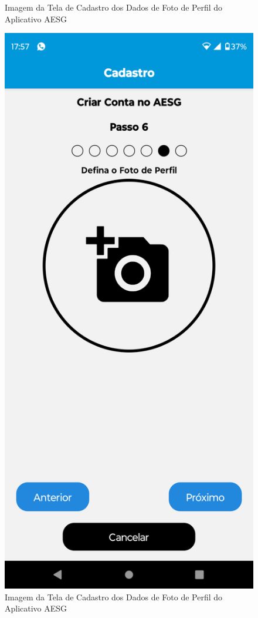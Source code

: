 \documentclass[
    12pt,                   %
    openright,              %
    oneside,                %
    a4paper,                %
    sumario=tradicional,    %
    english,                %
    brazil,                 %
    ]{abntex2}
\begin{document}
\begin{figure}[!h]
\begin{minipage}{0.5\textwidth}
                    \caption[Imagem da Tela de Cadastro dos Dados de Foto de Perfil do Aplicativo AESG]{ 
                    Imagem da Tela de Cadastro dos Dados de Foto de Perfil  do Aplicativo AESG}
                    \label{fig:AppTelaCadastro15}
                \end{minipage}%
                \begin{minipage}{0.5\textwidth}
                    \centering
                    \includegraphics[width=0.8\linewidth]{Imagens/App Images User/AUCadastro6.png}
                    \caption[Imagem da Tela de Cadastro dos Dados de Foto de Perfil Preenchido do Aplicativo AESG]{ 
                    Imagem da Tela de Cadastro dos Dados  de Foto de Perfil do Aplicativo AESG}
                    \label{fig:AppTelaCadastro6}
                \end{minipage}
            \end{figure}
\end{document}
